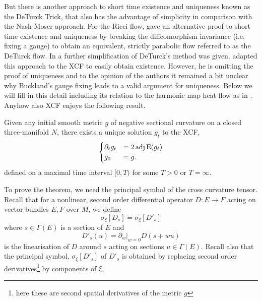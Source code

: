 \documentclass[a4paper,12pt]{amsart}
\begin{document}
But there is another approach to short time existence and uniqueness known as the DeTurck Trick, that also has the advantage of simplicity in comparison with the Nash-Moser approach. For the Ricci flow, \cite{MR697987} gave an alternative proof to short time existence and uniqueness by breaking the diffeomorphism invariance (i.e. fixing a gauge) to obtain an equivalent, strictly parabolic flow referred to as the DeTurck flow. In \cite[Section 6]{MR1375255} a further simplification of DeTurck's method was given. \cite{MR2207496} adapted this approach to the XCF to easily obtain existence. However, he is omitting the proof of uniqueness and to the opinion of the authors it remained a bit unclear why Buckland's gauge fixing leads to a valid argument for uniqueness. Below we will fill in this detail including its relation to the harmonic map heat flow as in \cite{MR1375255}. Anyhow also XCF enjoys the following result.
\begin{thm}
\label{thm:xcf_existence_uniqueness}
Given any initial smooth metric \(g\) of negative sectional curvature on a closed three-manifold \(N\), there exists a unique solution \(g_t\) to the XCF,
\[
\begin{cases}
\partial_t g_t &= 2\operatorname{adj}\operatorname{E}(g_t) \\
g_0 &= g.
\end{cases}
\]
defined on a maximal time interval \([0, T)\) for some \(T > 0\) or \(T = \infty\).
\end{thm}

To prove the theorem, we need the principal symbol of the cross curvature tensor. Recall that for a nonlinear, second order differential operator \(D : E \to F\) acting on vector bundles \(E, F\) over \(M\), we define
\begin{equation}
\label{eq:symbol}
\sigma_{\xi} [D_s] = \sigma_{\xi} [D'_s]
\end{equation}
where \(s \in \Gamma(E)\) is a section of \(E\) and
\[
D'_s (u) = \partial_w|_{w=0} D(s + w u)
\]
is the linearisation of \(D\) around \(s\) acting on sections \(u \in \Gamma(E)\). Recall also that the principal symbol, \(\sigma_{\xi} [D'_s]\) of \(D'_s\) is obtained by replacing second order derivatives\footnote{here these are second spatial derivatives of the metric $g$} by components of \(\xi\).
\end{document}
